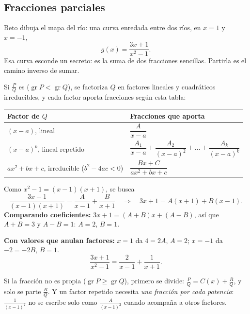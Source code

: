 \documentclass[11pt,a4paper]{article}
\newcommand{\gr}{\operatorname{gr}}
\begin{document}
\subsection{Fracciones parciales}
Beto dibuja el mapa del río: una curva enredada entre dos ríos, en $x=1$ y $x=-1$,
\[ g(x)=\frac{3x+1}{x^2-1}. \]
Esa curva esconde un secreto: es la suma de dos fracciones sencillas. Partirla es el camino inverso de sumar.

\begin{definicion}
Si $\frac{P}{Q}$ es  ($\gr P<\gr Q$), se factoriza $Q$ en factores lineales y cuadráticos irreducibles,
y cada factor aporta fracciones según esta tabla:
\begin{center}
\begin{tabular}{@{}ll@{}}
\toprule
Factor de $Q$ & Fracciones que aporta\\ \midrule
$(x-a)$, lineal & $\dfrac{A}{x-a}$\\[8pt]
$(x-a)^k$, lineal repetido & $\dfrac{A_1}{x-a}+\dfrac{A_2}{(x-a)^2}+\dots+\dfrac{A_k}{(x-a)^k}$\\[8pt]
$ax^2+bx+c$, irreducible ($b^2-4ac<0$) & $\dfrac{Bx+C}{ax^2+bx+c}$\\[6pt]
\bottomrule
\end{tabular}
\end{center}
\end{definicion}

\begin{ejemplo}
Como $x^2-1=(x-1)(x+1)$, se busca
\[ \frac{3x+1}{(x-1)(x+1)}=\frac{A}{x-1}+\frac{B}{x+1}\quad\Longrightarrow\quad 3x+1=A(x+1)+B(x-1). \]
\textbf{Comparando coeficientes:} $3x+1=(A+B)x+(A-B)$, así que $A+B=3$ y $A-B=1$: $A=2$, $B=1$.\par
\textbf{Con valores que anulan factores:} $x=1$ da $4=2A$, $A=2$; $x=-1$ da $-2=-2B$, $B=1$.
\[ \frac{3x+1}{x^2-1}=\frac{2}{x-1}+\frac{1}{x+1}. \]
\end{ejemplo}

\begin{ojo}
Si la fracción no es propia ($\gr P\ge\gr Q$), primero se divide: $\frac{P}{Q}=C(x)+\frac{R}{Q}$, y solo se parte
$\frac{R}{Q}$. Y un factor repetido necesita \emph{una fracción por cada potencia}: $\frac{1}{(x-1)^2}$ no se
escribe solo como $\frac{A}{(x-1)^2}$ cuando acompaña a otros factores.
\end{ojo}
\end{document}
